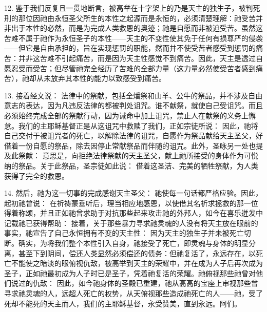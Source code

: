 12. 鉴于我们反复且一贯地断言，被高举在十字架上的乃是天主的独生子，被判死刑的那位因祂由永恒圣父所生的本性之起源而是永恒的，必须清楚理解：祂受苦并非出于本性的必然，而是为完成人类救恩的奥迹；祂是自愿而非被迫受苦。虽然这苦难不属于祂作为永恒圣子的本性——天主的不变性使其免于任何有损尊严的侵袭——但它是自由承担的，旨在实现惩罚的职能，然而并不使受苦者感受到惩罚的痛苦：并非这苦难不引起痛苦，而是因为天主性感觉不到痛苦。因此，天主是透过自愿忍受而受苦；但尽管祂完全经历了苦难的全部力量（这力量必然使受苦者感到痛苦），祂却从未放弃其本性的能力以致感受到痛苦。\par

13. 接着经文说： 法律中的祭献，包括全燔祭和山羊、公牛的祭品，并不涉及自由意志的表达，因为凡违反法律的都被判处诅咒。谁不献祭，就使自己受诅咒。而且必须始终完成全部的祭献行动，因为诫命中加上诅咒，禁止人在献祭的义务上懈怠。我们的主耶稣基督正是从这诅咒中救赎了我们，正如宗徒所说： 因此，祂将自己交付于被诅咒者的死亡，以解除法律的诅咒，自愿作为祭品献给天主圣父，好借着一份自愿的祭品，除去因停止常献祭品而伴随的诅咒。此外，圣咏另一处也提及此祭献： 意思是，向拒绝法律祭献的天主圣父，献上祂所接受的身体作为可悦纳的祭品。关于此祭品，圣宗徒如此说： 借着这圣洁、完美的牺牲祭献，为人类获得了完全的救恩。\par

14. 然后，祂为这一切事的完成感谢天主圣父： 祂使每一句话都严格应验。因此，起初祂曾说： 在祈祷蒙垂听后，理当相应地感恩，以使借其名祈求拯救的那一位得着称颂，并且正如祂曾求助于对抗那些起来攻击祂的外邦人，如今在喜乐迸发中记载祂已获得帮助： 接着，关于那些暴力寻求祂灵魂的人没有将天主放在眼前的事实，祂宣告了自己永恒拥有不变的天主性： 因为天主的独生子并未被死亡切断。确实，为将我们整个本性引入自身，祂接受了死亡，即灵魂与身体的明显分离，甚至下到阴间，偿还人类显然必须偿还的债务：但祂复活了，永远存在，以死亡不能使之暗淡的眼俯视仇敌，被高举到天主的荣耀中，并在成为人子后再次成为圣子，正如祂最初成为人子时已是圣子，凭着祂复活的荣耀。祂俯视那些祂曾对他们说过的仇敌： 因此，如今祂身体的圣殿已重建，祂从高高的宝座上审视那些曾寻求祂灵魂的人，远超人死亡的权势，从天俯视那些造成祂死亡的人——祂，受了死却不能死的天主而人，我们的主耶稣基督，永受赞美，直到永远。阿们。\par

